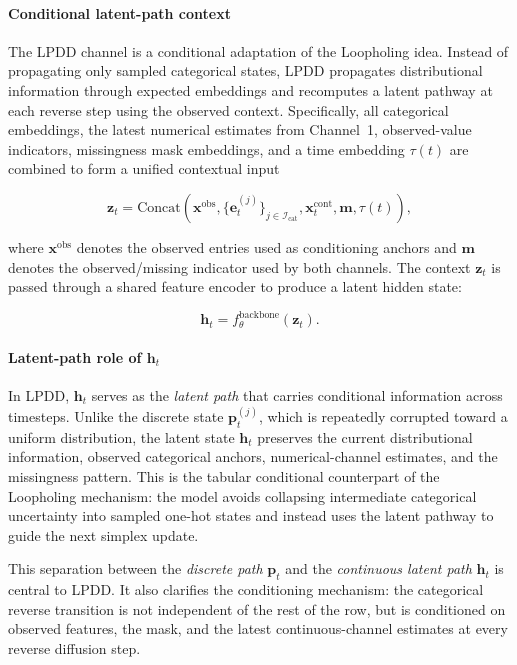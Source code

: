 \documentclass[times, review, 10pt]{elsarticle}
\begin{document}
\paragraph{Conditional latent-path context}
The LPDD channel is a conditional adaptation of the Loopholing idea. Instead
of propagating only sampled categorical states, LPDD propagates distributional
information through expected embeddings and recomputes a latent pathway at
each reverse step using the observed context. Specifically, all categorical
embeddings, the latest numerical estimates from Channel~1, observed-value
indicators, missingness mask embeddings, and a time embedding $\tau(t)$ are
combined to form a unified contextual input

\begin{equation}
\mathbf{z}_t =
\mathrm{Concat}\!\left(
\mathbf{x}^{\mathrm{obs}},
\{\mathbf{e}^{(j)}_t\}_{j\in\mathcal{I}_{\mathrm{cat}}},
\mathbf{x}^{\mathrm{cont}}_t,
\mathbf{m},
\tau(t)
\right),
\label{eq:lpdd_context}
\end{equation}

where $\mathbf{x}^{\mathrm{obs}}$ denotes the observed entries used as
conditioning anchors and $\mathbf{m}$ denotes the observed/missing indicator
used by both channels. The context $\mathbf{z}_t$ is passed through a shared feature
encoder to produce a latent hidden state:

\begin{equation}
\mathbf{h}_t = f_{\theta}^{\mathrm{backbone}}(\mathbf{z}_t).
\label{eq:project}
\end{equation}

\paragraph{Latent-path role of $\mathbf{h}_t$}
In LPDD, $\mathbf{h}_t$ serves as the \emph{latent path} that carries
conditional information across timesteps. Unlike the discrete state
$\mathbf{p}_t^{(j)}$, which is repeatedly corrupted toward a uniform
distribution, the latent state $\mathbf{h}_t$ preserves the current
distributional information, observed categorical anchors, numerical-channel
estimates, and the missingness pattern. This is the tabular conditional
counterpart of the Loopholing mechanism: the model avoids collapsing
intermediate categorical uncertainty into sampled one-hot states and instead
uses the latent pathway to guide the next simplex update.

This separation between the \emph{discrete path} $\mathbf{p}_t$ and the
\emph{continuous latent path} $\mathbf{h}_t$ is central to LPDD. It also
clarifies the conditioning mechanism: the categorical reverse transition is
not independent of the rest of the row, but is conditioned on observed
features, the mask, and the latest continuous-channel estimates at every
reverse diffusion step.
\end{document}
